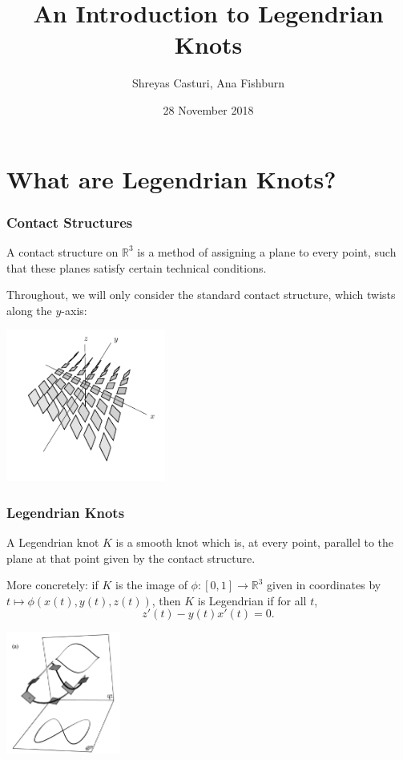 \documentclass{beamer}
\newcommand{\R}{\mathbb{R}}
\begin{document}
\title{An Introduction to Legendrian Knots}
\author{Shreyas Casturi, Ana Fishburn}
\date{28 November 2018}

\frame{\titlepage}

\section[Intro]{What are Legendrian Knots?}

\begin{frame}
    \frametitle{Contact Structures}
    \begin{definition}
    A \alert{contact structure} on $\R^3$ is a method of assigning a plane
    to every point, such that these planes satisfy certain technical conditions.
    \end{definition}

    Throughout, we will only consider the \alert{standard contact structure}, which
    twists along the $y$-axis: \\
    \begin{center}
        \includegraphics[height=5cm]{cStructure.png}
    \end{center}
    
\end{frame}

\begin{frame}
\frametitle{Legendrian Knots}
    \begin{definition}
    A \alert{Legendrian knot} $K$ is a smooth knot which is, at every point, parallel to the
    plane at that point given by the contact structure.
    \end{definition}

    More concretely: if $K$ is the image of $\phi : [0,1] \to \R^3$ given in coordinates by
    $t \mapsto \phi(x(t),y(t),z(t))$, then $K$
    is Legendrian if for all $t$,
    \[ z'(t) - y(t)x'(t) = 0. \]
    \begin{center}
    \includegraphics[height=4cm]{contactLegendrian.png}
    \end{center}

\end{frame}
\end{document}
